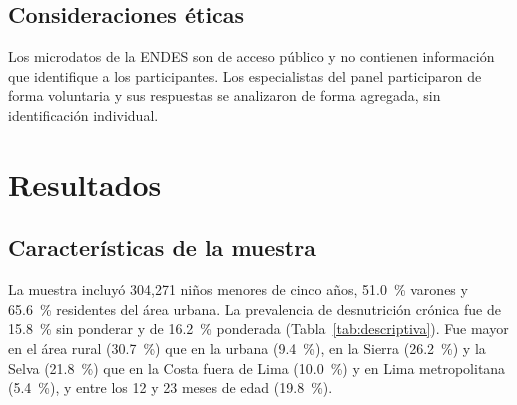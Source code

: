 \documentclass[final,5p,times,twocolumn,authoryear,lefttitle]{elsarticle}
\begin{document}
\subsection{Consideraciones éticas}

Los microdatos de la ENDES son de acceso público y no contienen información que identifique a los participantes. Los especialistas del panel participaron de forma voluntaria y sus respuestas se analizaron de forma agregada, sin identificación individual.

\section{Resultados}
\label{resultados}

\subsection{Características de la muestra}
\label{sec:muestra}

La muestra incluyó 304,271 niños menores de cinco años, 51.0~\% varones y 65.6~\% residentes del área urbana. La prevalencia de desnutrición crónica fue de 15.8~\% sin ponderar y de 16.2~\% ponderada (Tabla~\ref{tab:descriptiva}). Fue mayor en el área rural (30.7~\%) que en la urbana (9.4~\%), en la Sierra (26.2~\%) y la Selva (21.8~\%) que en la Costa fuera de Lima (10.0~\%) y en Lima metropolitana (5.4~\%), y entre los 12 y 23 meses de edad (19.8~\%).
\end{document}
